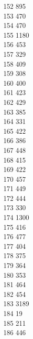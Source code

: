 { 152	895 \\
 153	470 \\
 154	470 \\
 155	1180 \\
 156	453 \\
 157	329 \\
 158	409 \\
 159	308 \\
 160	400 \\
 161	423 \\
 162	429 \\
 163	385 \\
 164	331 \\
 165	422 \\
 166	386 \\
 167	448 \\
 168	415 \\
 169	422 \\
 170	457 \\
 171	449 \\
 172	444 \\
 173	330 \\
 174	1300 \\
 175	416 \\
 176	477 \\
 177	404 \\
 178	375 \\
 179	364 \\
 180	353 \\
 181	464 \\
 182	454 \\
 183	3189 \\
 184	19 \\
 185	211 \\
 186	446 \\
}
